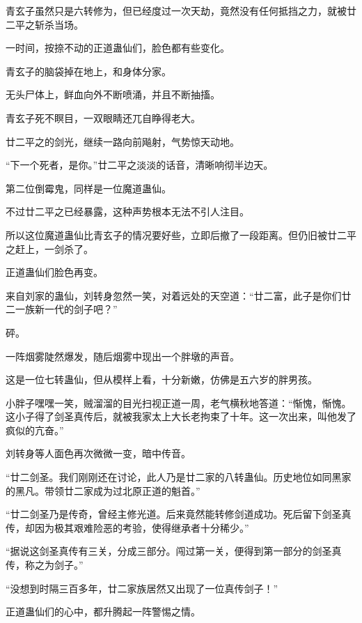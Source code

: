 
\begin{this_body}



青玄子虽然只是六转修为，但已经度过一次天劫，竟然没有任何抵挡之力，就被廿二平之斩杀当场。

一时间，按捺不动的正道蛊仙们，脸色都有些变化。

青玄子的脑袋掉在地上，和身体分家。

无头尸体上，鲜血向外不断喷涌，并且不断抽搐。

青玄子死不瞑目，一双眼睛还兀自睁得老大。

廿二平之的剑光，继续一路向前飚射，气势惊天动地。

“下一个死者，是你。”廿二平之淡淡的话音，清晰响彻半边天。

第二位倒霉鬼，同样是一位魔道蛊仙。

不过廿二平之已经暴露，这种声势根本无法不引人注目。

所以这位魔道蛊仙比青玄子的情况要好些，立即后撤了一段距离。但仍旧被廿二平之赶上，一剑杀了。

正道蛊仙们脸色再变。

来自刘家的蛊仙，刘转身忽然一笑，对着远处的天空道：“廿二富，此子是你们廿二一族新一代的剑子吧？”

砰。

一阵烟雾陡然爆发，随后烟雾中现出一个胖墩的声音。

这是一位七转蛊仙，但从模样上看，十分新嫩，仿佛是五六岁的胖男孩。

小胖子嘿嘿一笑，贼溜溜的目光扫视正道一周，老气横秋地答道：“惭愧，惭愧。这小子得了剑圣真传后，就被我家太上大长老拘束了十年。这一次出来，叫他发了疯似的亢奋。”

刘转身等人面色再次微微一变，暗中传音。

“廿二剑圣。我们刚刚还在讨论，此人乃是廿二家的八转蛊仙。历史地位如同黑家的黑凡。带领廿二家成为过北原正道的魁首。”

“廿二剑圣乃是传奇，曾经主修光道。后来竟然能转修剑道成功。死后留下剑圣真传，却因为极其艰难险恶的考验，使得继承者十分稀少。”

“据说这剑圣真传有三关，分成三部分。闯过第一关，便得到第一部分的剑圣真传，称之为剑子。”

“没想到时隔三百多年，廿二家族居然又出现了一位真传剑子！”

正道蛊仙们的心中，都升腾起一阵警惕之情。


\end{this_body}
